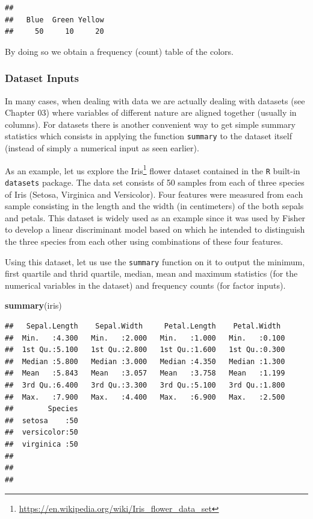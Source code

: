\documentclass[12pt,]{krantz}
\newenvironment{Shaded}{\begin{snugshade}}{\end{snugshade}}
\newcommand{\KeywordTok}[1]{\textcolor[rgb]{0.27,0.27,0.27}{\textbf{#1}}}
\newcommand{\NormalTok}[1]{#1}
\renewcommand{\href}[2]{#2\footnote{\url{#1}}}
\begin{document}
\begin{verbatim}
## 
##   Blue  Green Yellow 
##     50     10     20
\end{verbatim}

By doing so we obtain a frequency (count) table of the colors.

\subsubsection{Dataset Inputs}\label{dataset-inputs}

In many cases, when dealing with data we are actually dealing with
datasets (see Chapter 03) where variables of different nature are
aligned together (usually in columns). For datasets there is another
convenient way to get simple summary statistics which consists in
applying the function \texttt{summary} to the dataset itself (instead of
simply a numerical input as seen earlier).

As an example, let us explore the
\href{https://en.wikipedia.org/wiki/Iris_flower_data_set}{Iris} flower
dataset contained in the \texttt{R} built-in \texttt{datasets} package.
The data set consists of 50 samples from each of three species of Iris
(Setosa, Virginica and Versicolor). Four features were measured from
each sample consisting in the length and the width (in centimeters) of
the both sepals and petals. This dataset is widely used as an example
since it was used by Fisher to develop a linear discriminant model based
on which he intended to distinguish the three species from each other
using combinations of these four features.

Using this dataset, let us use the \texttt{summary} function on it to
output the minimum, first quartile and thrid quartile, median, mean and
maximum statistics (for the numerical variables in the dataset) and
frequency counts (for factor inputs).

\begin{Shaded}
\begin{Highlighting}[]
\KeywordTok{summary}\NormalTok{(iris)}
\end{Highlighting}
\end{Shaded}

\begin{verbatim}
##   Sepal.Length    Sepal.Width     Petal.Length    Petal.Width   
##  Min.   :4.300   Min.   :2.000   Min.   :1.000   Min.   :0.100  
##  1st Qu.:5.100   1st Qu.:2.800   1st Qu.:1.600   1st Qu.:0.300  
##  Median :5.800   Median :3.000   Median :4.350   Median :1.300  
##  Mean   :5.843   Mean   :3.057   Mean   :3.758   Mean   :1.199  
##  3rd Qu.:6.400   3rd Qu.:3.300   3rd Qu.:5.100   3rd Qu.:1.800  
##  Max.   :7.900   Max.   :4.400   Max.   :6.900   Max.   :2.500  
##        Species  
##  setosa    :50  
##  versicolor:50  
##  virginica :50  
##                 
##                 
## 
\end{verbatim}
\end{document}
